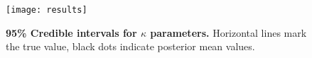 \begin{figure}[h!]
\centering
\texttt{[image: results]} 
\caption{
{ \footnotesize 
{\bf 95\% Credible intervals for $\kappa$ parameters.} Horizontal lines mark the true value, black dots indicate posterior mean values.
} %
}
\label{fig:results}
\end{figure}












% 
